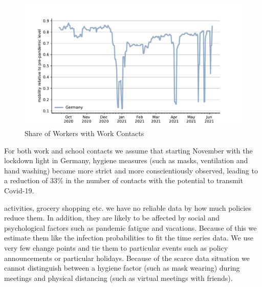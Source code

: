 \begin{figure}[ht]
    \centering
    \includegraphics[width=\textwidth]{figures/results/figures/data/work_multiplier_since_sep}
    \caption{Share of Workers with Work Contacts}
    \label{fig:work_multiplier}
\end{figure}

For both work and school contacts we assume that starting November with the lockdown
light in Germany, hygiene measures (such as masks, ventilation and hand washing) became
more strict and more conscientiously observed, leading to a reduction of 33\% in the
number of contacts with the potential to transmit Covid-19.

activities, grocery shopping etc. we have no reliable data by how much policies reduce
them. In addition, they are likely to be affected by social and psychological factors
such as pandemic fatigue and vacations. Because of this we estimate them like the
infection probabilities to fit the time series data. We use very few change points and
tie them to particular events such as policy announcements or particular holidays.
Because of the scarce data situation we cannot distinguish between a hygiene factor (such
as mask wearing) during meetings and physical distancing (such as virtual meetings with
friends).

